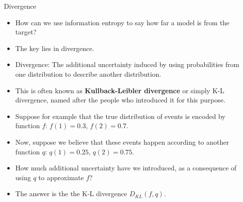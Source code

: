 \documentclass[handout]{beamer}
\begin{document}
\begin{frame}{Divergence}
\scriptsize{

\begin{itemize}

\item  How can we use information entropy to say how far a model is from the target? 

\item The key lies in divergence.

\item Divergence: The additional uncertainty induced by using probabilities from
one distribution to describe another distribution.

\item This is often known as \textbf{Kullback-Leibler divergence} or simply K-L divergence, named after the people who introduced it for this purpose.

\item Suppose for example that the true distribution of events is encoded by function $f$: $f(1) = 0.3$, $f(2) = 0.7$.
\item Now, suppose we believe that these events happen according to another function $q$: $q(1) = 0.25$, $q(2) = 0.75$.

\item How much additional uncertainty have we introduced, as a consequence of using $q$ to approximate $f$? 

\item  The answer is the the K-L divergence $D_{KL}(f,q)$.

\end{itemize}


} 
\end{frame}
\end{document}

